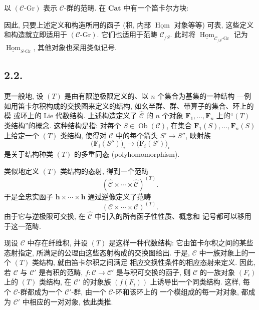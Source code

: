 以 \((\mathscr C\text{-}\mathrm{Gr})\) 表示 \(\mathscr C\)-群的范畴.
在 \(\mathbf{Cat}\) 中有一个笛卡尔方块:

\begin{center}
  
\end{center}

因此, 只要上述定义和构造所用的函子 (积, 内部
\(\underline{\operatorname{Hom}}\) 对象等等) 可表, 这些定义和构造就立即适用于
\((\mathscr C\text{-}\mathrm{Gr})\). 它们也适用于范畴 \(\mathscr C_{/S}\).
此时将 \(\underline{\operatorname{Hom}}_{\mathscr C_{/S}\text{-}\mathrm{Gr}}\)
记为 \(\underline{\operatorname{Hom}}_{S\text{-}\mathrm{Gr}}\), 其他对象也采用类似记号.

\subsection*{2.2.}

更一般地, 设 \((T)\) 是由有限逆极限定义的、以 \(n\) 个集合为基集的一种结构
---例如用笛卡尔积构成的交换图来定义的结构, 如幺半群、群、带算子的集合、环上的模
或环上的 Lie 代数结构. 上述构造定义了 \(\widehat{\mathscr C}\) 的 \(n\) 个对象
\(\mathbf F_1,\ldots,\mathbf F_n\) 上的“\((T)\) 类结构”的概念.
这种结构是指: 对每个 \(S\in\operatorname{Ob}(\mathscr C)\), 在集合
\(\mathbf F_1(S),\ldots,\mathbf F_n(S)\) 上给定一个 \((T)\) 类结构,
使得对 \(\mathscr C\) 中的每个箭头 \(S'\to S''\), 映射族
\[
  \bigl(\mathbf F_i(S'')\bigr)_i
  \longrightarrow
  \bigl(\mathbf F_i(S')\bigr)_i
\]
是关于结构种类 \((T)\) 的多重同态 (polyhomomorphism).

类似地定义 \((T)\) 类结构的态射, 得到一个范畴
\[
  (\widehat{\mathscr C}\times\cdots\times\widehat{\mathscr C})^{(T)}.
\]
于是全忠实函子 \(\mathbf h\times\cdots\times\mathbf h\) 通过逆像定义了范畴
\[
  (\mathscr C\times\cdots\times\mathscr C)^{(T)}.
\]
由于它与逆极限可交换, 在 \(\widehat{\mathscr C}\) 中引入的所有函子性性质、概念和
记号都可以移用于这一范畴.

现设 \(\mathscr C\) 中存在纤维积, 并设 \((T)\) 是这样一种代数结构:
它由笛卡尔积之间的某些态射指定, 所满足的公理由这些态射构成的交换图给出.
于是, \(\mathscr C\) 中一族对象上的一个 \((T)\) 类结构, 就由笛卡尔积之间满足
相应交换性条件的相应态射来定义. 因此, 若 \(\mathscr C\) 与 \(\mathscr C'\)
是有积的范畴, \(f:\mathscr C\to\mathscr C'\) 是与积可交换的函子, 则
\(\mathscr C\) 的一族对象 \((F_i)\) 上的 \((T)\) 类结构, 在
\(\mathscr C'\) 的对象族 \((f(F_i))\) 上诱导出一个同类结构. 这样, 每个
\(\mathscr C\)-群都成为一个 \(\mathscr C'\)-群, 由一个 \(\mathscr C\)-环和该环上的
一个模组成的每一对对象, 都成为 \(\mathscr C'\) 中相应的一对对象, 依此类推.


